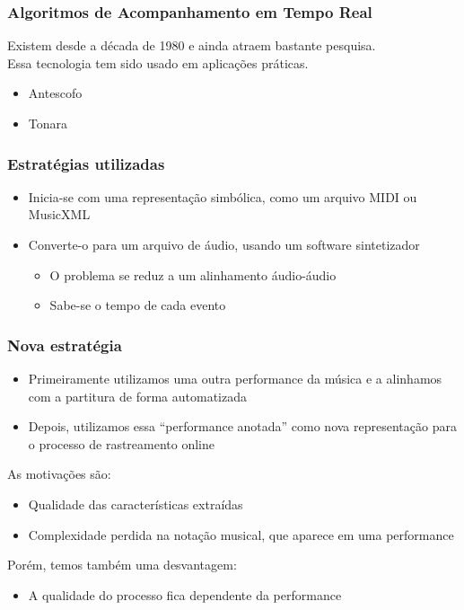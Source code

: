 \begin{frame}
  \frametitle{Algoritmos de Acompanhamento em Tempo Real}
  Existem desde a década de 1980 e ainda atraem bastante pesquisa.\pause\\
  Essa tecnologia tem sido usado em aplicações práticas.\pause
  \begin{itemize}
    \item Antescofo\\
    \item Tonara
  \end{itemize}
\end{frame}

\begin{frame}
  \frametitle{Estratégias utilizadas}
  \begin{itemize}
    \item Inicia-se com uma representação simbólica, como um arquivo MIDI ou MusicXML\\\pause
    \item Converte-o para um arquivo de áudio, usando um software sintetizador\pause
      \begin{itemize}
        \item O problema se reduz a um alinhamento áudio-áudio\\\pause
        \item Sabe-se o tempo de cada evento\\
      \end{itemize}
  \end{itemize}
\end{frame}

\begin{frame}
  \frametitle{Nova estratégia}
  \begin{itemize}
    \item Primeiramente utilizamos uma outra performance da música e a alinhamos com a partitura de forma automatizada\\\pause
    \item Depois, utilizamos essa ``performance anotada'' como nova representação para o processo de rastreamento online\pause
  \end{itemize}

  As motivações são:\pause
  \begin{itemize}
    \item Qualidade das características extraídas\\\pause
    \item Complexidade perdida na notação musical, que aparece em uma performance\pause
  \end{itemize}
  Porém, temos também uma desvantagem:\pause
  \begin{itemize}
    \item A qualidade do processo fica dependente da performance\\
  \end{itemize}
\end{frame}

